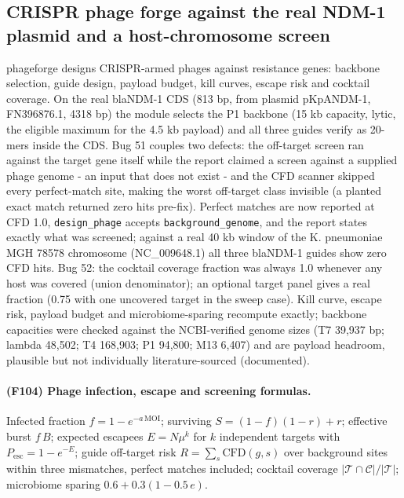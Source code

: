 \subsection{CRISPR phage forge against the real NDM-1 plasmid and a host-chromosome screen}
phageforge designs CRISPR-armed phages against resistance genes: backbone selection, guide design, payload budget, kill curves, escape risk and cocktail coverage. On the real blaNDM-1 CDS (813 bp, from plasmid pKpANDM-1, FN396876.1, 4318 bp) the module selects the P1 backbone (15 kb capacity, lytic, the eligible maximum for the 4.5 kb payload) and all three guides verify as 20-mers inside the CDS. Bug 51 couples two defects: the off-target screen ran against the target gene itself while the report claimed a screen against a supplied phage genome - an input that does not exist - and the CFD scanner skipped every perfect-match site, making the worst off-target class invisible (a planted exact match returned zero hits pre-fix). Perfect matches are now reported at CFD 1.0, \texttt{design\_phage} accepts \texttt{background\_genome}, and the report states exactly what was screened; against a real 40 kb window of the K. pneumoniae MGH 78578 chromosome (NC\_009648.1) all three blaNDM-1 guides show zero CFD hits. Bug 52: the cocktail coverage fraction was always 1.0 whenever any host was covered (union denominator); an optional target panel gives a real fraction (0.75 with one uncovered target in the sweep case). Kill curve, escape risk, payload budget and microbiome-sparing recompute exactly; backbone capacities were checked against the NCBI-verified genome sizes (T7 39,937 bp; lambda 48,502; T4 168,903; P1 94,800; M13 6,407) and are payload headroom, plausible but not individually literature-sourced (documented).
\paragraph{(F104) Phage infection, escape and screening formulas.} Infected fraction $f=1-e^{-a\,\mathrm{MOI}}$; surviving $S=(1-f)(1-r)+r$; effective burst $f\,B$; expected escapees $E=N\mu^{k}$ for $k$ independent targets with $P_{\mathrm{esc}}=1-e^{-E}$; guide off-target risk $R=\sum_{s}\mathrm{CFD}(g,s)$ over background sites within three mismatches, perfect matches included; cocktail coverage $|\mathcal{T}\cap\mathcal{C}|/|\mathcal{T}|$; microbiome sparing $0.6+0.3(1-0.5\,e)$.

